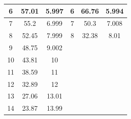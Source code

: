 \documentclass[a4paper, 14pt]{extarticle}%
\begin{document}
\begin{table}[h!]
\begin{center}
\begin{tabular}{|c|c|c|ccc}
6                          & 57.01                         & 5.997                         & \multicolumn{1}{c|}{6}                         & \multicolumn{1}{c|}{66.76}                         & \multicolumn{1}{c|}{5.994}                            \\ \hline
\rowcolor[HTML]{9698ED} 
7                          & 55.2                          & 6.999                         & \multicolumn{1}{c|}{\cellcolor[HTML]{9698ED}7} & \multicolumn{1}{c|}{\cellcolor[HTML]{9698ED}50.3}  & \multicolumn{1}{c|}{\cellcolor[HTML]{9698ED}7.008}    \\ \hline
8                          & 52.45                         & 7.999                         & \multicolumn{1}{c|}{8}                         & \multicolumn{1}{c|}{32.38}                         & \multicolumn{1}{c|}{8.01}                             \\ \hline
\cellcolor[HTML]{9698ED}9  & \cellcolor[HTML]{9698ED}48.75 & \cellcolor[HTML]{9698ED}9.002 &                                                &                                                    &                                                       \\ \cline{1-3}
10                         & 43.81                         & 10                            &                                                &                                                    &                                                       \\ \cline{1-3}
\cellcolor[HTML]{9698ED}11 & \cellcolor[HTML]{9698ED}38.59 & \cellcolor[HTML]{9698ED}11    &                                                &                                                    &                                                       \\ \cline{1-3}
12                         & 32.89                         & 12                            &                                                &                                                    &                                                       \\ \cline{1-3}
\cellcolor[HTML]{9698ED}13 & \cellcolor[HTML]{9698ED}27.06 & \cellcolor[HTML]{9698ED}13.01 &                                                &                                                    &                                                       \\ \cline{1-3}
14                         & 23.87                         & 13.99                         &                                                &                                                    &                                                       \\ \cline{1-3}

\end{tabular}
\end{center}
\end{table}
\end{document}
